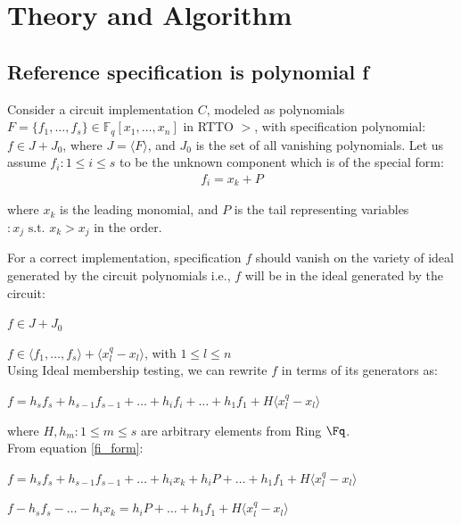 \section{Theory and Algorithm}

\subsection{Reference specification is polynomial f}
Consider a circuit implementation $C$, modeled as polynomials $F = \{f_1,\dots,f_s\}\in \mathbb{F}_q[x_1,\dots, x_n]$ in RTTO $>$, with specification polynomial: $f \in J + J_0$, where $J=\langle F \rangle$, and $J_0$ is the set of all vanishing polynomials. Let us assume $f_i:1\le i \le s$ to be the unknown component which is of the special form:
\begin{gather} 
\label{fi_form}
f_i = x_k + P
\end{gather}

where $x_k$ is the leading monomial, and $P$ is the tail representing variables$:x_j \text{ s.t. } x_k>x_j$ in the order. 

For a correct implementation, specification $f$ should vanish on the variety of ideal generated by the circuit polynomials i.e., $f$ will be in the ideal generated by the circuit:

$f \in J + J_0$

$f \in \langle f_1,\dots,f_s\rangle + \langle x_l^q-x_l\rangle$, with $1\le l \le n$\\
Using Ideal membership testing, we can rewrite $f$ in terms of its generators as:

$f = h_sf_s + h_{s-1}f_{s-1} +\dots+h_if_i+\dots+h_1f_1+H\langle x_l^q-x_l\rangle$

where $H, h_m:1\le m \le s$ are arbitrary elements from Ring $\Fq$.\\
From equation \ref{fi_form}:

{\small$f = h_sf_s + h_{s-1}f_{s-1} +\dots+h_ix_k+h_iP+\dots+h_1f_1+H\langle x_l^q-x_l\rangle$}

$f - h_sf_s -\dots-h_ix_k = h_iP+\dots+h_1f_1+H\langle x_l^q-x_l\rangle$

